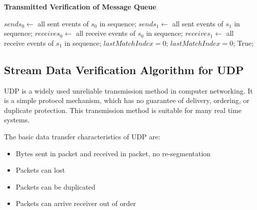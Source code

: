 \begin{algorithm}[H]
\DontPrintSemicolon
\caption{{\bf Transmitted Verification of Message Queue } \label{dataAlg3}}
\;
$sends_0 \leftarrow$ all sent events of $s_0$ in sequence;\;
$sends_1 \leftarrow$ all sent events of $s_1$ in sequence;\;
$receives_0 \leftarrow$ all receive events of $s_0$ in sequence;\;
$receives_1 \leftarrow$ all receive events of $s_1$ in sequence;\;
$lastMatchIndex = 0$;\;
$lastMatchIndex = 0$;\;
 \KwRet True;\;
\end{algorithm} 

\subsection{Stream Data Verification Algorithm for  UDP}
UDP is a widely used unreliable transmission method in computer networking. It is a simple protocol mechanism, which has no guarantee of delivery, ordering, or duplicate protection. This transmission method is suitable for many real time systems. 

The basic data transfer characteristics of UDP are:
\begin{itemize}
  \item Bytes sent in packet and received in packet, no re-segmentation
  \item Packets can lost
  \item Packets can be duplicated
  \item Packets can arrive receiver out of order
\end{itemize}

